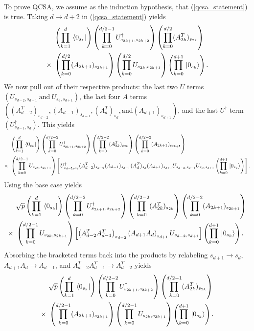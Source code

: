 \documentclass[10pt]{article}
\begin{document}
To prove QCSA, we assume as the induction hypothesis, that (\ref{qcsa_statement}) is true. Taking $d\to d+2$ in (\ref{qcsa_statement}) yields
\begin{align}
&
\left(\prod_{k=1}^{d}\bra*{0_{s_k}}\right)
\left(\prod_{k=0}^{d/2-1}U^\dagger_{s_{2k+1},s_{2k+2}}\right)
\left(\prod_{k=0}^{d/2}(A^T_{2k})_{s_{2k}}\right)
\nonumber
\\
\times \ &
\left(\prod_{k=0}^{d/2}(A_{2k+1})_{s_{2k+1}}\right)
\left(\prod_{k=0}^{d/2}U_{s_{2k},s_{2k+1}}\right)
\left(\prod_{k=0}^{d+1}\ket*{0_{s_k}}\right).
\end{align}
We now pull out of their respective products: the last two $U$ terms $\left(U_{s_{d-2},s_{d-1}} \ \text{and} \ U_{s_{d},s_{d+1}}\right)$, the last four $A$ terms $\left((A^T_{d-2})_{s_{d-2}},(A_{d-1})_{s_{d-1}},(A^T_{d})_{s_{d}}, \text{and} (A_{d+1})_{s_{d+1}}\right)$, and the last $U^\dagger$ term $\left(U^\dagger_{s_{d-1},s_d}\right)$. This yields
\begin{align}
&
\left(\prod_{k=1}^{d}\bra*{0_{s_k}}\right)
\left(\prod_{k=0}^{d/2-2}U^\dagger_{s_{2k+1},s_{2k+2}}\right)
\left(\prod_{k=0}^{d/2-2}(A^T_{2k})_{s_{2k}}\right)
\left(\prod_{k=0}^{d/2-2}(A_{2k+1})_{s_{2k+1}}\right)
\nonumber
\\
\times \ &
\left(\prod_{k=0}^{d/2-1}U_{s_{2k},s_{2k+1}}\right)
\left[
U^\dagger_{s_{d-1},s_{d}}
(A^T_{d-2})_{s_{d-2}}(A_{d-1})_{s_{d-1}}(A^T_{d})_{s_{d}}(A_{d+1})_{s_{d+1}}
U_{s_{d-2},s_{d-1}}U_{s_{d},s_{d+1}}
\left(\prod_{k=0}^{d+1}\ket*{0_{s_k}}\right)\right].
\end{align}
Using the base case yields
\begin{align}
&\sqrt{p}
\left(\prod_{k=1}^{d}\bra*{0_{s_k}}\right)
\left(\prod_{k=0}^{d/2-2}U^\dagger_{s_{2k+1},s_{2k+2}}\right)
\left(\prod_{k=0}^{d/2-2}(A^T_{2k})_{s_{2k}}\right)
\left(\prod_{k=0}^{d/2-2}(A_{2k+1})_{s_{2k+1}}\right)
\nonumber
\\
\times \ &
\left(\prod_{k=0}^{d/2-1}U_{s_{2k},s_{2k+1}}\right)
\left[
\left(A^T_{d-2}A^T_{d-1}\right)_{s_{d-2}}
\left(A_{d+1}A_d\right)_{s_{d+1}}
U_{s_{d-2},s_{d+1}}\right]
\left(\prod_{k=0}^{d+1}\ket*{0_{s_k}}\right).
\end{align}
Absorbing the bracketed terms back into the products by relabeling $s_{d+1}\to s_d$, $A_{d+1}A_d\to A_{d-1}$, and $A^T_{d-2}A^T_{d-1}\to A^T_{d-2}$ yields
\begin{align}
&\sqrt{p}
\left(\prod_{k=1}^{d}\bra*{0_{s_k}}\right)
\left(\prod_{k=0}^{d/2-2}U^\dagger_{s_{2k+1},s_{2k+2}}\right)
\left(\prod_{k=0}^{d/2-1}(A^T_{2k})_{s_{2k}}\right)
\nonumber
\\
\times \ &
\left(\prod_{k=0}^{d/2-1}(A_{2k+1})_{s_{2k+1}}\right)
\left(\prod_{k=0}^{d/2-1}U_{s_{2k},s_{2k+1}}\right)
\left(\prod_{k=0}^{d+1}\ket*{0_{s_k}}\right).
\end{align}
\end{document}

